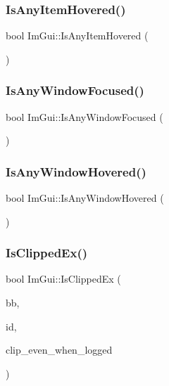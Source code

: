 \hypertarget{namespace_im_gui_a0512146617bb55e24ebcfbe3ce6553d5}{}\label{namespace_im_gui_a0512146617bb55e24ebcfbe3ce6553d5} 
\subsubsection{\texorpdfstring{Is\+Any\+Item\+Hovered()}{IsAnyItemHovered()}}
{\footnotesize\ttfamily bool Im\+Gui\+::\+Is\+Any\+Item\+Hovered (\begin{DoxyParamCaption}{ }\end{DoxyParamCaption})}

\hypertarget{namespace_im_gui_ad45d4a6513c1275fccf1539fa3b2f109}{}\label{namespace_im_gui_ad45d4a6513c1275fccf1539fa3b2f109} 
\subsubsection{\texorpdfstring{Is\+Any\+Window\+Focused()}{IsAnyWindowFocused()}}
{\footnotesize\ttfamily bool Im\+Gui\+::\+Is\+Any\+Window\+Focused (\begin{DoxyParamCaption}{ }\end{DoxyParamCaption})}

\hypertarget{namespace_im_gui_a62379e94283e247288c9a6c15a2b797e}{}\label{namespace_im_gui_a62379e94283e247288c9a6c15a2b797e} 
\subsubsection{\texorpdfstring{Is\+Any\+Window\+Hovered()}{IsAnyWindowHovered()}}
{\footnotesize\ttfamily bool Im\+Gui\+::\+Is\+Any\+Window\+Hovered (\begin{DoxyParamCaption}{ }\end{DoxyParamCaption})}

\hypertarget{namespace_im_gui_a8674467ae34d04bc99df1f7f98f47407}{}\label{namespace_im_gui_a8674467ae34d04bc99df1f7f98f47407} 
\subsubsection{\texorpdfstring{Is\+Clipped\+Ex()}{IsClippedEx()}}
{\footnotesize\ttfamily bool Im\+Gui\+::\+Is\+Clipped\+Ex (\begin{DoxyParamCaption}\item[{const \hyperlink{struct_im_rect}{Im\+Rect} \&}]{bb,  }\item[{Im\+Gui\+ID}]{id,  }\item[{bool}]{clip\+\_\+even\+\_\+when\+\_\+logged }\end{DoxyParamCaption})}

